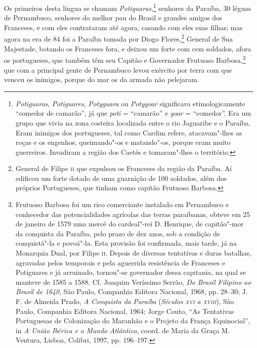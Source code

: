  Os primeiros desta língua se chamam \textit{Potiguaras},\footnote{ \textit{Potiguaras}, 
\textit{Potiguares, Potyguara} ou \textit{Potygoar} 
significava etimologicamente ``comedor de camarão'', já
que \textit{poti} = ``camarão'' e \textit{goar} = ``comedor''. Era um grupo
que vivia na zona costeira localizada entre o rio Jaguaribe e o
Paraíba. Eram inimigos dos portugueses, tal como Cardim refere,
atacavam"-lhes as roças e os engenhos, queimando"-os e matando"-os, porque
eram muito guerreiros. Invadiram a região dos Caetés e tomaram"-lhes o
território.} senhores da Paraíba, 30 léguas de Pernambuco,
senhores do melhor pau do Brasil e grandes amigos dos Franceses, e com
eles contrataram até agora, casando com eles suas filhas; mas agora na
era de 84 foi a Paraíba tomada por Diogo Flores,\footnote{ General 
de Filipe \textsc{ii} que expulsou os Franceses da região da Paraíba. Aí
edificou um forte dotado de uma guarnição de 100 soldados, além dos
próprios Portugueses, que tinham como capitão Frutuoso Barbosa.} 
General de Sua Majestade, botando os Franceses fora, e deixou um forte
com cem soldados, afora os portugueses, que também têm seu Capitão e
Governador Frutuoso Barbosa,\footnote{ Frutuoso Barbosa foi um rico
comerciante instalado em Pernambuco e conhecedor das potencialidades
agrícolas das terras paraibanas, obteve em 25 de janeiro de 1579 uma
mercê do cardeal"-rei D. Henrique, de capitão"-mor da conquista da
Paraíba, pelo prazo de dez anos, sob a condição de conquistá"-la e
povoá"-la. Esta provisão foi confirmada, mais tarde, já na Monarquia
Dual, por Filipe \textsc{ii}. Depois de diversas tentativas e duras batalhas,
agravadas pelos temporais e pela aguerrida resistência de Franceses e
Potiguares e já arruinado, tornou"-se governador dessa capitania, na
qual se manteve de 1585 a 1588. Cf. Joaquim Veríssimo Serrão,
\textit{Do Brasil Filipino ao Brasil de 1640}, São Paulo, Companhia
Editora Nacional, 1968, pp. 28--30; J. F. de Almeida Prado, \textit{A
Conquista da Paraíba} (\textit{Séculos \textsc{xvi} a \textsc{xviii}}), São Paulo, Companhia
Editora Nacional, 1964; Jorge Couto, ``As Tentativas Portuguesas de
Colonização do Maranhão e o Projeto da França Equinocial'', in
\textit{A União Ibérica e o Mundo Atlântico}, coord. de Maria da Graça
M. Ventura, Lisboa, Colibri, 1997, pp. 196--197.} que com a principal
gente de Pernambuco levou exército por terra com que venceu os
inimigos, porque do mar os da armada não pelejaram. 


